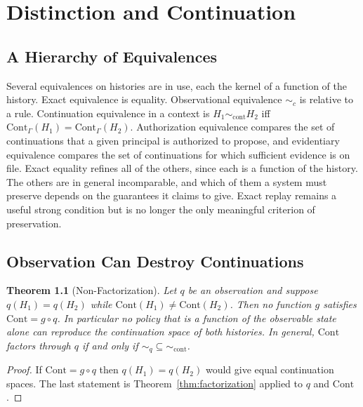 \documentclass[12pt,oneside,openany]{book}
\theoremstyle{spherepop}
\newtheorem{theorem}[definition]{Theorem}
\theoremstyle{remarkstyle}
\begin{document}
\chapter{Distinction and Continuation}
\label{ch:distinction}

\section{A Hierarchy of Equivalences}

Several equivalences on histories are in use, each the kernel of a function of the history. Exact equivalence is equality. Observational equivalence $\sim_c$ is relative to a rule. Continuation equivalence in a context is $H_1\sim_{\mathrm{cont}}H_2$ iff $\mathrm{Cont}_\Gamma(H_1)=\mathrm{Cont}_\Gamma(H_2)$. Authorization equivalence compares the set of continuations that a given principal is authorized to propose, and evidentiary equivalence compares the set of continuations for which sufficient evidence is on file. Exact equality refines all of the others, since each is a function of the history. The others are in general incomparable, and which of them a system must preserve depends on the guarantees it claims to give. Exact replay remains a useful strong condition but is no longer the only meaningful criterion of preservation.

\section{Observation Can Destroy Continuations}

\begin{theorem}[Non-Factorization]
\label{thm:nonfactor}
Let $q$ be an observation and suppose $q(H_1)=q(H_2)$ while $\mathrm{Cont}(H_1)\ne\mathrm{Cont}(H_2)$. Then no function $g$ satisfies $\mathrm{Cont}=g\circ q$. In particular no policy that is a function of the observable state alone can reproduce the continuation space of both histories. In general, $\mathrm{Cont}$ factors through $q$ if and only if ${\sim_q}\subseteq{\sim_{\mathrm{cont}}}$.
\end{theorem}

\begin{proof}
If $\mathrm{Cont}=g\circ q$ then $q(H_1)=q(H_2)$ would give equal continuation spaces. The last statement is Theorem~\ref{thm:factorization} applied to $q$ and $\mathrm{Cont}$.
\end{proof}
\end{document}
